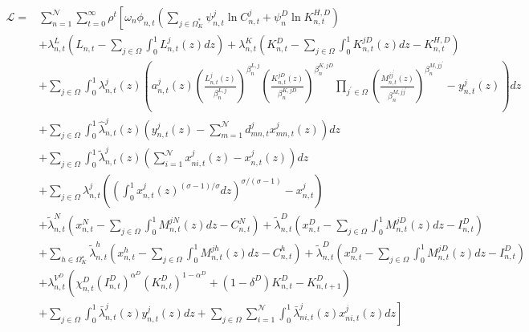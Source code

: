 \documentclass[12pt, bibtotoc, tablecaptionabove, figurecaptionabove, fleqn]{article}
\begin{document}
\begin{equation*}
\begin{aligned}
\mathcal{L}=& \sum_{n=1}^{\mathcal{N}} \sum_{t=0}^{\infty} \rho^{t}\left[\omega_{n} \phi_{n, t}\left(\sum_{j \in \Omega_{K}^{*}} \psi_{n, t}^{j} \ln C_{n, t}^{j}+ \psi^{D}_n \ln K_{n, t}^{H, D}\right)\right.\\
&+\lambda_{n, t}^{L}\left(L_{n, t}-\sum_{j \in \Omega} \int_{0}^{1} L_{n, t}^{j}(z) d z\right)+ \lambda_{n, t}^{K}\left(K_{n, t}^{D}-\sum_{j \in \Omega} \int_{0}^{1} K_{n, t}^{j D}(z) d z-K_{n, t}^{H, D}\right) \\
&+\sum_{j \in \Omega} \int_{0}^{1} \lambda_{n, t}^{j}(z)\left(a_{n, t}^{j}(z)\left(\frac{L_{n, t}^{j}(z)}{\beta_{n}^{L, j}}\right)^{\beta_{n}^{L, j}} \left(\frac{K_{n, t}^{j D}(z)}{\beta_{n}^{K, j D}}\right)^{\beta_{n}^{K, j D}} \prod_{j^{\prime} \in \Omega}\left(\frac{M_{n, t}^{j j^{\prime}}(z)}{\beta_{n}^{M, j j^{\prime}}}\right)^{\beta_{n}^{M, j j^{\prime}}}-y_{n, t}^{j}(z)\right) d z \\
&+\sum_{j \in \Omega} \int_{0}^{1} \hat{\lambda}_{n, t}^{j}(z)\left(y_{n, t}^{j}(z)-\sum_{m=1}^{\mathcal{N}} d_{m n, t}^{j} x_{m n, t}^{j}(z)\right) d z \\
&+\sum_{j \in \Omega} \int_{0}^{1} \tilde{\lambda}_{n, t}^{j}(z)\left(\sum_{i=1}^{\mathcal{N}} x_{n i, t}^{j}(z)-x_{n, t}^{j}(z)\right) d z \\
&+\sum_{j \in \Omega} \lambda_{n, t}^{j}\left(\left(\int_{0}^{1} x_{n, t}^{j}(z)^{(\sigma-1) / \sigma} d z\right)^{\sigma /(\sigma-1)}-x_{n, t}^{j}\right) \\
&+\tilde{\lambda}_{n, t}^{N}\left(x_{n, t}^{N}-\sum_{j \in \Omega} \int_{0}^{1} M_{n, t}^{j N}(z) d z-C_{n, t}^{N}\right)+\tilde{\lambda}_{n, t}^{D}\left(x_{n, t}^{D}-\sum_{j \in \Omega} \int_{0}^{1} M_{n, t}^{j D}(z) d z-I_{n, t}^{D}\right) \\
&+\sum_{h \in \Omega_K^{\star}}\tilde{\lambda}_{n, t}^{h}\left(x_{n, t}^{h}-\sum_{j \in \Omega} \int_{0}^{1} M_{n, t}^{j h}(z) d z-C_{n, t}^{h}\right)+\tilde{\lambda}_{n, t}^{D}\left(x_{n, t}^{D}-\sum_{j \in \Omega} \int_{0}^{1} M_{n, t}^{j D}(z) d z-I_{n, t}^{D}\right) \\
&+\lambda_{n, t}^{V^D}\left(\chi_{n, t}^{D}\left(I_{n, t}^{D}\right)^{\alpha^D}\left(K_{n, t}^{D}\right)^{1-\alpha^{D}}+\left(1-\delta^{D}\right) K_{n, t}^{D}-K_{n, t+1}^{D}\right) \\
&\left.+\sum_{j \in \Omega} \int_{0}^{1} \bar{\lambda}_{n, t}^{j}(z) y_{n, t}^{j}(z) d z+\sum_{j \in \Omega} \sum_{i=1}^{\mathcal{N}} \int_{0}^{1} \bar{\lambda}_{n i, t}^{j}(z) x_{n i, t}^{j}(z) d z\right]
\end{aligned}
\end{equation*}
\end{document}
